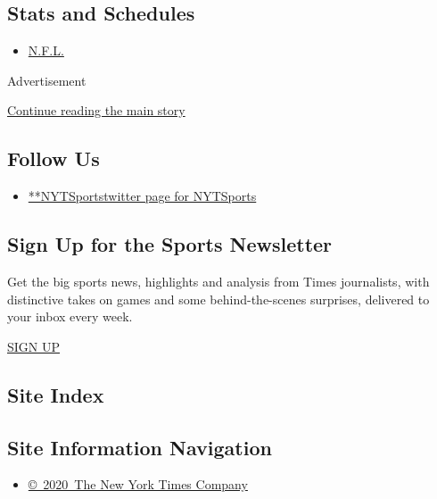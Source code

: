 \hypertarget{stats-and-schedules}{%
\subsection{Stats and Schedules}\label{stats-and-schedules}}

\begin{itemize}
\tightlist
\item
  \protect\hyperlink{}{N.F.L.}
\end{itemize}

Advertisement

\protect\hyperlink{after-mktg}{Continue reading the main story}

\hypertarget{follow-us}{%
\subsection{Follow Us}\label{follow-us}}

\begin{itemize}
\tightlist
\item
  \href{https://twitter.com/NYTSports}{**NYTSportstwitter page for
  NYTSports}
\end{itemize}

\hypertarget{sign-up-for-the-sports-newsletter}{%
\subsection{Sign Up for the Sports
Newsletter}\label{sign-up-for-the-sports-newsletter}}

Get the big sports news, highlights and analysis from Times journalists,
with distinctive takes on games and some behind-the-scenes surprises,
delivered to your inbox every week.

\href{/newsletters/signup/SP}{SIGN UP}

\hypertarget{site-index}{%
\subsection{Site Index}\label{site-index}}

\hypertarget{site-information-navigation}{%
\subsection{Site Information
Navigation}\label{site-information-navigation}}

\begin{itemize}
\tightlist
\item
  \href{https://help.nytimes.com/hc/en-us/articles/115014792127-Copyright-notice}{©~2020~The
  New York Times Company}
\end{itemize}

